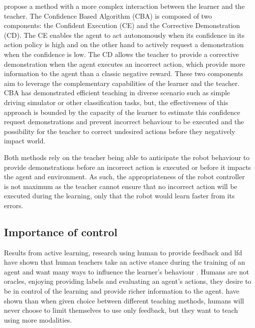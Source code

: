 \cite{chernova2009} propose a method with a more complex interaction between the learner and the teacher. The Confidence Based Algorithm (CBA) is composed of two components: the Confident Execution (CE) and the Corrective Demonstration (CD). The CE enables the agent to act autonomously when its confidence in its action policy is high and on the other hand to actively request a demonstration when the confidence is low. The CD allows the teacher to provide a corrective demonstration when the agent executes an incorrect action, which provide more information to the agent than a classic negative reward. These two components aim to leverage the complementary capabilities of the learner and the teacher. CBA has demonstrated efficient teaching in diverse scenario such as simple driving simulator or other classification tasks, but, the effectiveness of this approach is bounded by the capacity of the learner to estimate this confidence request demonstrations and prevent incorrect behaviour to be executed and the possibility for the teacher to correct undesired actions before they negatively impact world. 

Both methods rely on the teacher being able to anticipate the robot behaviour to provide demonstrations before an incorrect action is executed or before it impacts the agent and environment. As such, the appropriateness of the robot controller is not maximum as the teacher cannot ensure that no incorrect action will be executed during the learning, only that the robot would learn faster from its errors.

\subsection{Importance of control}

Results from active learning, research using human to provide feedback and \gls{lfd} have shown that human teachers take an active stance during the training of an agent and want many ways to influence the learner's behaviour \citep{amershi2014power}. Humans are not oracles, enjoying providing labels and evaluating an agent's actions, they desire to be in control of the learning and provide richer information to the agent. \cite{kaochar2011towards} have shown than when given choice between different teaching methods, humans will never choose to limit themselves to use only feedback, but they want to teach using more modalities.

